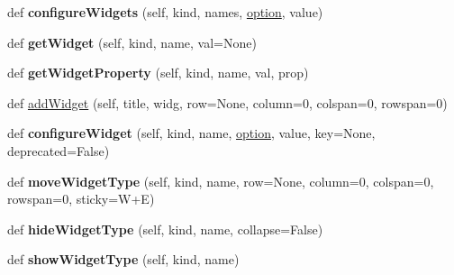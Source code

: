 \begin{DoxyCompactItemize}
\mbox{\label{class_python_01_g_u_i_1_1appjar_1_1gui_ab4a2e29c52af4ac7e0a145197bf3f9bc}} 
def {\bfseries configure\+Widgets} (self, kind, names, \hyperlink{class_python_01_g_u_i_1_1appjar_1_1gui_a146e85757fb347d225d2a0087c3edeae}{option}, value)
\item 
\mbox{\label{class_python_01_g_u_i_1_1appjar_1_1gui_a91c1637b53e475fc2b3e538c1df6a5ad}} 
def {\bfseries get\+Widget} (self, kind, name, val=None)
\item 
\mbox{\label{class_python_01_g_u_i_1_1appjar_1_1gui_a3e2d59557fc9571cf081a1be33fba67d}} 
def {\bfseries get\+Widget\+Property} (self, kind, name, val, prop)
\item 
def \hyperlink{class_python_01_g_u_i_1_1appjar_1_1gui_a8526c3be9ed18a28197c32f53ec9cb0e}{add\+Widget} (self, title, widg, row=None, column=0, colspan=0, rowspan=0)
\item 
\mbox{\label{class_python_01_g_u_i_1_1appjar_1_1gui_a87d24ee92a4513338bdaccca370561fb}} 
def {\bfseries configure\+Widget} (self, kind, name, \hyperlink{class_python_01_g_u_i_1_1appjar_1_1gui_a146e85757fb347d225d2a0087c3edeae}{option}, value, key=None, deprecated=False)
\item 
\mbox{\label{class_python_01_g_u_i_1_1appjar_1_1gui_a12bf93f079f82a1df787b4e4926348ec}} 
def {\bfseries move\+Widget\+Type} (self, kind, name, row=None, column=0, colspan=0, rowspan=0, sticky=W+E)
\item 
\mbox{\label{class_python_01_g_u_i_1_1appjar_1_1gui_a185d87e1bc0ec466ad86d4544c2e650c}} 
def {\bfseries hide\+Widget\+Type} (self, kind, name, collapse=False)
\item 
\mbox{\label{class_python_01_g_u_i_1_1appjar_1_1gui_a7c1f982f8f50bf5574192043cf823275}} 
def {\bfseries show\+Widget\+Type} (self, kind, name)
\item 
\mbox{\label{class_python_01_g_u_i_1_1appjar_1_1gui_a9a053f76461df4b6cbc26120609d0506}} 

\end{DoxyCompactItemize}
